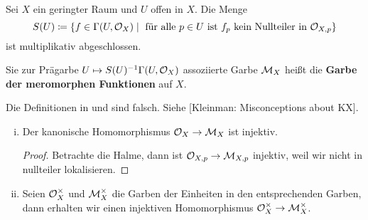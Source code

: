 \begin{bem}
\label{bem:14.5}
	Sei $X$ ein geringter Raum und $U$ offen in $X$. Die Menge
	\[
		S(U) \coloneqq \{ f \in \Gamma(U,\mathcal{O}_X)\mid \text{ für alle }p \in U\text{ ist }f_p \text{ kein Nullteiler in }\mathcal{O}_{X,p}\}
	\]
	ist multiplikativ abgeschlossen.
\end{bem}

\begin{defn}
\label{defn:14.6}
	Sie zur Prägarbe $U \mapsto S(U)^{-1}\Gamma(U,\mathcal{O}_X)$ assoziierte Garbe $\mathcal{M}_X$ heißt die \textbf{Garbe der meromorphen Funktionen} auf $X$.
\end{defn}

\begin{warn*}
	Die Definitionen in \cite[{}II.6]{hartshorne1977algebraic} und \cite[§21]{grothendieck1967elements} sind falsch. Siehe [Kleinman: Misconceptions about KX].
\end{warn*}

\begin{bem}
\label{bem:14.7}
	\begin{enumerate}[i)]
		\item Der kanonische Homomorphismus $\mathcal{O}_X \to \mathcal{M}_X$ ist injektiv.
		\begin{proof}
			Betrachte die Halme, dann ist $\mathcal{O}_{X,p}\to \mathcal{M}_{X,p}$ injektiv, weil wir nicht in nullteiler lokalisieren.
		\end{proof}
		\item Seien $\mathcal{O}_X^\times$ und $\mathcal{M}_X^\times$ die Garben der Einheiten in den entsprechenden Garben, dann erhalten wir einen injektiven Homomorphismus $\mathcal{O}_X^\times \to \mathcal{M}_X^\times$.
	\end{enumerate}
\end{bem}

